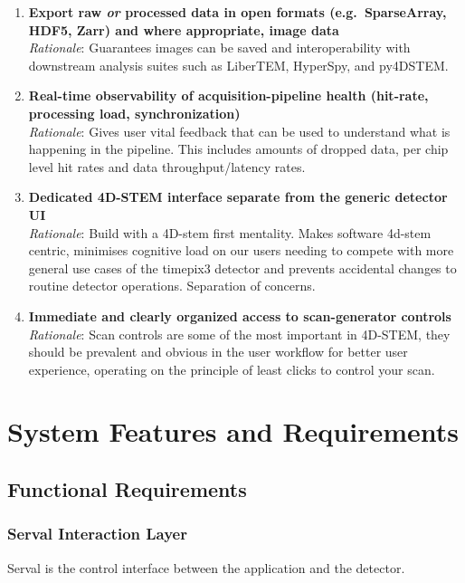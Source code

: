 \documentclass[10pt]{article}
\begin{document}
\begin{enumerate}
  \item \textbf{Export raw \emph{or} processed data in open formats (e.g.\ SparseArray, HDF5, Zarr) and where appropriate, image data}\\
        \textit{Rationale}: Guarantees images can be saved and interoperability with downstream analysis suites such as LiberTEM, HyperSpy, and py4DSTEM.
  \item \textbf{Real-time observability of acquisition-pipeline health (hit-rate, processing load, synchronization)}\\
        \textit{Rationale}: Gives user vital feedback that can be used to understand what is happening in the pipeline. This includes amounts of dropped data, per chip level hit rates and data throughput/latency rates.
  \item \textbf{Dedicated 4D-STEM interface separate from the generic detector UI}\\
  \textit{Rationale}: Build with a 4D-stem first mentality. Makes software 4d-stem centric, minimises cognitive load on our users needing to compete with more general use cases of the timepix3 detector and prevents accidental changes to routine detector operations. Separation of concerns.
  \item \textbf{Immediate and clearly organized access to scan-generator controls}\\
  \textit{Rationale}: Scan controls are some of the most important in 4D-STEM, they should be prevalent and obvious in the user workflow for better user experience, operating on the principle of least clicks to control your scan.
\end{enumerate}


\section{System Features and Requirements}


\subsection{Functional Requirements}

\subsubsection{Serval Interaction Layer}
Serval is the control interface between the application and the detector.
\end{document}
